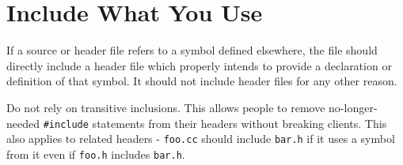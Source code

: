 
\section{Include What You Use}\label{sec:include-what-you-use}
If a source or header file refers to a symbol defined elsewhere, the file should directly include a header file which properly intends to provide a declaration or definition of that symbol. It should not include header files for any other reason.

Do not rely on transitive inclusions. This allows people to remove no-longer-needed \texttt{#include} statements from their headers without breaking clients. This also applies to related headers - \texttt{foo.cc} should include \texttt{bar.h} if it uses a symbol from it even if \texttt{foo.h} includes \texttt{bar.h}.